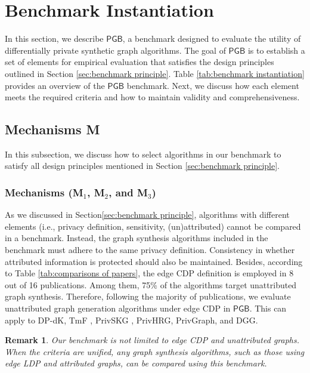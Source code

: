 \documentclass[conference]{IEEEtran}
\theoremstyle{plain}
\newtheorem{remark}{Remark}
\begin{document}
\section{Benchmark Instantiation}
\label{sec:benchmark instantiation}

In this section, we describe $\mathsf{PGB}$, a benchmark designed to evaluate the utility of differentially private synthetic graph algorithms. 
The goal of $\mathsf{PGB}$ is to establish a set of elements for empirical evaluation that satisfies the design principles outlined in Section \ref{sec:benchmark principle}. 
Table \ref{tab:benchmark instantiation} provides an overview of the $\mathsf{PGB}$ benchmark. 
Next, we discuss how each element meets the required criteria and how to maintain validity and comprehensiveness.

\subsection{Mechanisms \textbf{M}}
In this subsection, we discuss how to select algorithms in our benchmark to satisfy all design principles mentioned in Section \ref{sec:benchmark principle}.

\subsubsection{Mechanisms (\textbf{M$_1$}, \textbf{M$_2$}, and \textbf{M$_3$})}
As we discussed in Section\ref{sec:benchmark principle}, algorithms with different elements (i.e., privacy definition, sensitivity, (un)attributed) cannot be compared in a benchmark.
Instead, the graph synthesis algorithms included in the benchmark must adhere to the same privacy definition. 
Consistency in whether attributed information is protected should also be maintained. Besides, according to Table \ref{tab:comparisons of papers}, the edge CDP definition is employed in 8 out of 16 publications. 
Among them, 75\% of the algorithms target unattributed graph synthesis. 
Therefore, following the majority of publications, we evaluate unattributed graph
generation algorithms under edge CDP in $\mathsf{PGB}$. 
This can apply to  DP-dK\cite{wang2013preserving},  TmF \cite{nguyen2015differentially}, PrivSKG \cite{mir2012differentially}, PrivHRG\cite{xiao2014differentially}, PrivGraph\cite{yuan2023privgraph}, and DGG\cite{qin2017generating}.

\begin{remark}
  Our benchmark is not limited to edge CDP and unattributed graphs. 
  When the criteria are unified, any graph synthesis algorithms, such as those using edge LDP and attributed graphs, can be compared using this benchmark.
\end{remark}
\end{document}
